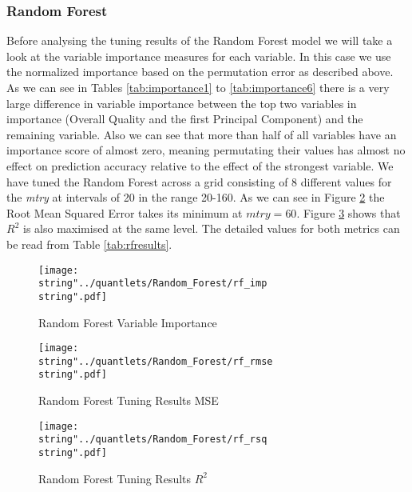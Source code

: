 \subsubsection{Random Forest}
Before analysing the tuning results of the Random Forest model we will take a look at the variable importance measures for each variable. In this case we use the normalized importance based on the permutation error as described above. As we can see in Tables \ref{tab:importance1} to \ref{tab:importance6} there is a very large difference in variable importance between the top two variables in importance (Overall Quality and the first Principal Component) and the remaining variable. Also we can see that more than half of all variables have an importance score of almost zero, meaning permutating their values has almost no effect on prediction accuracy relative to the effect of the strongest variable. 
We have tuned the Random Forest across a grid consisting of 8 different values for the \textit{mtry} at intervals of 20 in the range 20-160. As we can see in Figure \ref{fig:rf_rmse} the Root Mean Squared Error takes its minimum at $mtry = 60$. Figure \ref{fig:rf_rsq} shows that $R^2$ is also maximised at the same level. The detailed values for both metrics can be read from Table \ref{tab:rfresults}.









\begin{figure}
  \centering
\texttt{[image: \\string"../quantlets/Random\_Forest/rf\_imp\\string".pdf]}
  \caption{Random Forest Variable Importance}\label{fig:rf_imp}
\end{figure}

\begin{figure}
  \centering
\texttt{[image: \\string"../quantlets/Random\_Forest/rf\_rmse\\string".pdf]}
  \caption{Random Forest Tuning Results MSE}\label{fig:rf_rmse}
\end{figure}

\begin{figure}
  \centering
\texttt{[image: \\string"../quantlets/Random\_Forest/rf\_rsq\\string".pdf]}
  \caption{Random Forest Tuning Results $R^2$}\label{fig:rf_rsq}
\end{figure}